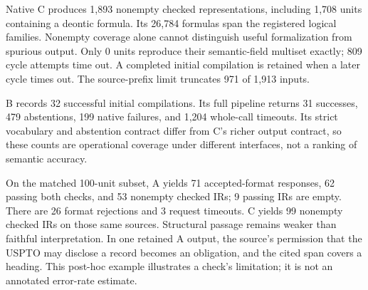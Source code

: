 Native C produces 1,893 nonempty checked representations, including 1,708 units containing a deontic formula. Its 26,784 formulas span the registered logical families. Nonempty coverage alone cannot distinguish useful formalization from spurious output. Only 0 units reproduce their semantic-field multiset exactly; 809 cycle attempts time out. A completed initial compilation is retained when a later cycle times out. The source-prefix limit truncates 971 of 1,913 inputs.

B records 32 successful initial compilations. Its full pipeline returns 31 successes, 479 abstentions, 199 native failures, and 1,204 whole-call timeouts. Its strict vocabulary and abstention contract differ from C's richer output contract, so these counts are operational coverage under different interfaces, not a ranking of semantic accuracy.

On the matched 100-unit subset, A yields 71 accepted-format responses, 62 passing both checks, and 53 nonempty checked IRs; 9 passing IRs are empty. There are 26 format rejections and 3 request timeouts. C yields 99 nonempty checked IRs on those same sources. Structural passage remains weaker than faithful interpretation. In one retained A output, the source's permission that the USPTO may disclose a record becomes an obligation, and the cited span covers a heading. This post-hoc example illustrates a check's limitation; it is not an annotated error-rate estimate.
